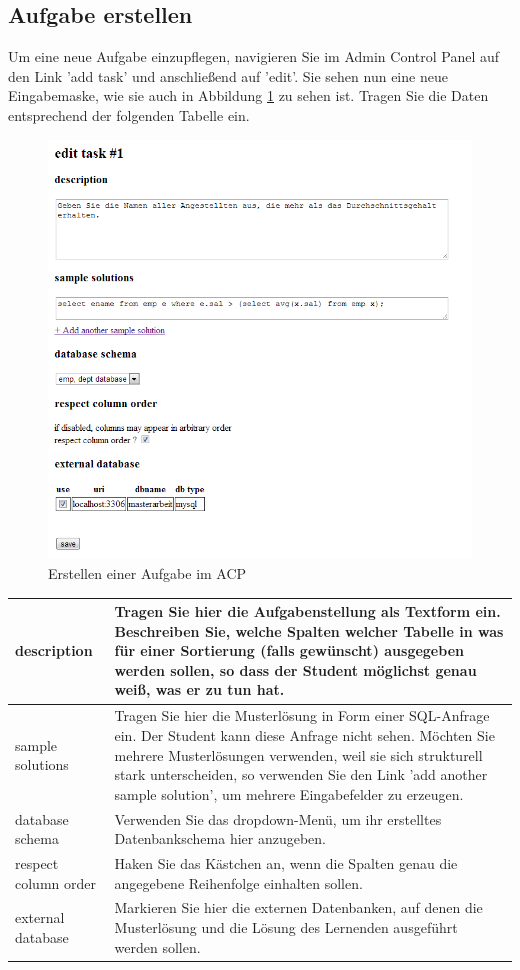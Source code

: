 \documentclass[12pt]{scrreprt}
\theoremstyle{remark}
\begin{document}
\subsection{Aufgabe erstellen}

Um eine neue Aufgabe einzupflegen, navigieren Sie im Admin Control Panel auf den Link 'add task' und anschließend auf 'edit'. Sie sehen nun eine neue Eingabemaske, wie sie auch in Abbildung \ref{fig:acp2} zu sehen ist. Tragen Sie die Daten entsprechend der folgenden Tabelle ein.

\begin{figure}
\centering
\includegraphics[scale=0.61]{Bilder/screen_acp_1.png}
\caption{Erstellen einer Aufgabe im ACP}
\label{fig:acp2}
\end{figure}

\begin{tabular}{|l|p{12cm}|}\hline
description & Tragen Sie hier die Aufgabenstellung als Textform ein. Beschreiben Sie, welche Spalten welcher Tabelle in was für einer Sortierung (falls gewünscht) ausgegeben werden sollen, so dass der Student möglichst genau weiß, was er zu tun hat.\\\hline
sample solutions & Tragen Sie hier die Musterlösung in Form einer SQL-Anfrage ein. Der Student kann diese Anfrage nicht sehen. Möchten Sie mehrere Musterlösungen verwenden, weil sie sich strukturell stark unterscheiden, so verwenden Sie den Link 'add another sample solution', um mehrere Eingabefelder zu erzeugen.\\\hline
database schema & Verwenden Sie das dropdown-Menü, um ihr erstelltes Datenbankschema hier anzugeben.\\\hline
respect column order & Haken Sie das Kästchen an, wenn die Spalten genau die angegebene Reihenfolge einhalten sollen.\\\hline
external database & Markieren Sie hier die externen Datenbanken, auf denen die Musterlösung und die Lösung des Lernenden ausgeführt werden sollen.\\\hline
\end{tabular}
\end{document}
